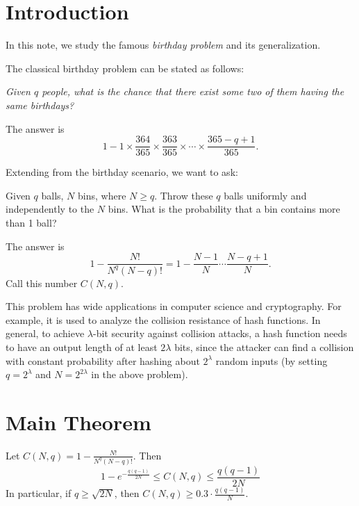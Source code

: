 





\maketitle

\section{Introduction}

In this note, we study the famous \textit{birthday problem} and its generalization.

The classical birthday problem can be stated as follows:
\begin{center}
\textit{
Given $q$ people, what is the chance that there exist some two of them having the same birthdays?
}
\end{center}
The answer is
\[
	1 - 1 \times \frac{364}{365} \times \frac{363}{365} \times \cdots \times \frac{365-q+1}{365}.
\]

Extending from the birthday scenario, we want to ask:
\begin{problem}
Given $q$ balls, $N$ bins, where $N \geq q$. Throw these $q$ balls uniformly and independently to the $N$ bins. What is the probability that a bin contains more than 1 ball?
\end{problem}
The answer is
\[
	1 - \frac{N!}{N^q (N-q)!} = 1 - \frac{N-1}{N} \cdots \frac{N-q+1}{N}.
\]
Call this number $C(N,q)$.

This problem has wide applications in computer science and cryptography. For example, it is used to analyze the collision resistance of hash functions. In general, to achieve $\lambda$-bit security against collision attacks, a hash function needs to have an output length of at least $2\lambda$ bits, since the attacker can find a collision with constant probability after hashing about $2^{\lambda}$ random inputs (by setting $q = 2^{\lambda}$ and $N = 2^{2\lambda}$ in the above problem).

\section{Main Theorem}

\begin{theorem}[Bounds on $C(N,q)$]

Let $C(N,q) = 1 - \frac{N!}{N^q (N-q)!}$. Then 
\[
	1 - e^{-\frac{q(q-1)}{2N}} \leq C(N, q) \leq \frac{q(q-1)}{2N}
\]
In particular, if $q \geq \sqrt{2N}$, then $C(N, q) \geq 0.3 \cdot \frac{q(q-1)}{N}$.

\end{theorem}

